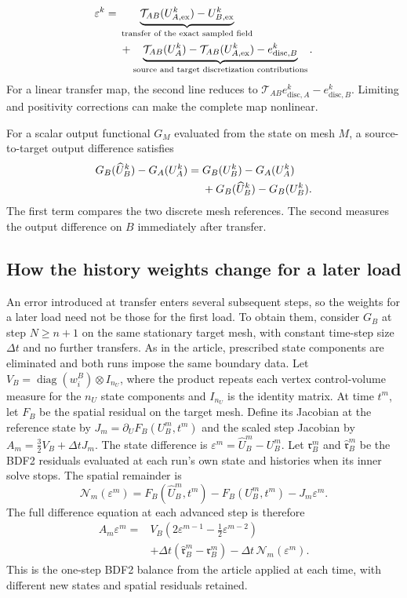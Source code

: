 \documentclass[11pt,a4paper]{article}
\newcommand{\eps}{\varepsilon}
\begin{document}
\begin{align}
 \eps^k={}&
 \underbrace{\mathcal T_{AB}(U_{A,\mathrm{ex}}^k)-U_{B,\mathrm{ex}}^k}
             _{\text{transfer of the exact sampled field}}\notag\\
 &+\underbrace{\mathcal T_{AB}(U_A^k)-\mathcal T_{AB}(U_{A,\mathrm{ex}}^k)
                      -e_{\mathrm{disc},B}^k}
             _{\text{source and target discretization contributions}}.
 \label{eq:defect-decomposition}
\end{align}
For a linear transfer map, the second line reduces to $\mathcal T_{AB}e_{\mathrm{disc},A}^k-e_{\mathrm{disc},B}^k$. Limiting and positivity corrections can make the complete map nonlinear.

For a scalar output functional $G_M$ evaluated from the state on mesh $M$, a source-to-target output difference satisfies
\begin{align}
 G_B(\widehat U_B^k)-G_A(U_A^k)
 ={}&G_B(U_B^k)-G_A(U_A^k)\notag\\
 &+G_B(\widehat U_B^k)-G_B(U_B^k).
 \label{eq:observable-decomposition}
\end{align}
The first term compares the two discrete mesh references. The second measures the output difference on $B$ immediately after transfer.

\subsection{How the history weights change for a later load}
An error introduced at transfer enters several subsequent steps, so the weights for a later load need not be those for the first load. To obtain them, consider $G_B$ at step $N\ge n+1$ on the same stationary target mesh, with constant time-step size $\Delta t$ and no further transfers. As in the article, prescribed state components are eliminated and both runs impose the same boundary data. Let $V_B=\operatorname{diag}(w_i^B)\otimes I_{n_U}$, where the product repeats each vertex control-volume measure for the $n_U$ state components and $I_{n_U}$ is the identity matrix. At time $t^m$, let $F_B$ be the spatial residual on the target mesh. Define its Jacobian at the reference state by $J_m=\partial_U F_B(U_B^m,t^m)$ and the scaled step Jacobian by $A_m=\tfrac32V_B+\Delta t J_m$. The state difference is $\eps^m=\widehat U_B^m-U_B^m$. Let $\mathfrak r_B^m$ and $\widehat{\mathfrak r}_B^m$ be the BDF2 residuals evaluated at each run's own state and histories when its inner solve stops. The spatial remainder is
\[
 \mathcal N_m(\eps^m)
 =F_B(\widehat U_B^m,t^m)-F_B(U_B^m,t^m)-J_m\eps^m.
\]
The full difference equation at each advanced step is therefore
\begin{equation}
\begin{aligned}
 A_m\eps^m={}&V_B(2\eps^{m-1}-\tfrac12\eps^{m-2})\\
 &+\Delta t(\widehat{\mathfrak r}_B^m-\mathfrak r_B^m)
   -\Delta t\,\mathcal N_m(\eps^m).
\end{aligned}
\label{supp:eq:later-state-balance}
\end{equation}
This is the one-step BDF2 balance from the article applied at each time, with different new states and spatial residuals retained.
\end{document}
